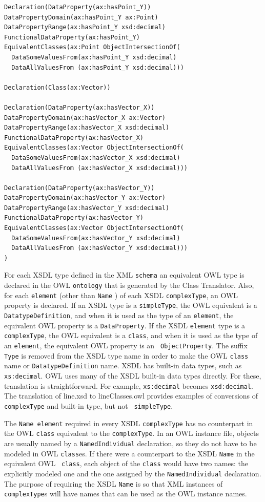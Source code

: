 \documentclass[preprint,12pt]{elsarticle}
\begin{document}
\begin{verbatim}
Declaration(DataProperty(ax:hasPoint_Y))
DataPropertyDomain(ax:hasPoint_Y ax:Point)
DataPropertyRange(ax:hasPoint_Y xsd:decimal)
FunctionalDataProperty(ax:hasPoint_Y)
EquivalentClasses(ax:Point ObjectIntersectionOf(
  DataSomeValuesFrom(ax:hasPoint_Y xsd:decimal)
  DataAllValuesFrom (ax:hasPoint_Y xsd:decimal)))

Declaration(Class(ax:Vector))

Declaration(DataProperty(ax:hasVector_X))
DataPropertyDomain(ax:hasVector_X ax:Vector)
DataPropertyRange(ax:hasVector_X xsd:decimal)
FunctionalDataProperty(ax:hasVector_X)
EquivalentClasses(ax:Vector ObjectIntersectionOf(
  DataSomeValuesFrom(ax:hasVector_X xsd:decimal)
  DataAllValuesFrom (ax:hasVector_X xsd:decimal)))

Declaration(DataProperty(ax:hasVector_Y))
DataPropertyDomain(ax:hasVector_Y ax:Vector)
DataPropertyRange(ax:hasVector_Y xsd:decimal)
FunctionalDataProperty(ax:hasVector_Y)
EquivalentClasses(ax:Vector ObjectIntersectionOf(
  DataSomeValuesFrom(ax:hasVector_Y xsd:decimal)
  DataAllValuesFrom (ax:hasVector_Y xsd:decimal)))
)
\end{verbatim}

For each XSDL type defined in the XML {\tt schema} an equivalent OWL type
is declared in the OWL {\tt ontology} that is generated by the Class
Translator. Also, for each {\tt element} (other than {\tt Name} ) of each
XSDL {\tt complexType}, an OWL property is declared. If an XSDL type is a
{\tt simpleType}, the OWL equivalent is a {\tt DatatypeDefinition}, and
when it is used as the type of an {\tt element}, the equivalent OWL
property is a {\tt DataProperty}. If the XSDL {\tt element} type is a {\tt
  complexType}, the OWL equivalent is a {\tt class}, and when it is used as
the type of an {\tt element}, the equivalent OWL property is an {\tt
  ObjectProperty}. The suffix {\tt Type} is removed from the XSDL type
name in order to make the OWL {\tt class} name or {\tt DatatypeDefinition}
name. XSDL has built-in data types, such as {\tt xs:decimal}. OWL uses
many of the XSDL built-in data types directly. For these, translation is
straightforward. For example, {\tt xs:decimal} becomes {\tt xsd:decimal}.
The translation of line.xsd to lineClasses.owl provides examples of
conversions of {\tt complexType} and built-in type, but not {\tt
  simpleType}.

The {\tt Name element} required in every XSDL {\tt complexType} has no
counterpart in the OWL {\tt class} equivalent to the {\tt complexType}. In
an OWL instance file, objects are usually named by a {\tt NamedIndividual}
declaration, so they do not have to be modeled in OWL {\tt class}es. If
there were a counterpart to the XSDL {\tt Name} in the equivalent OWL {\tt
  class}, each object of the {\tt class} would have two names: the
explicitly modeled one and the one assigned by the {\tt NamedIndividual}
declaration. The purpose of requiring the XSDL {\tt Name} is so that XML
instances of {\tt complexType}s will have names that can be used as the OWL
instance names.
\end{document}

